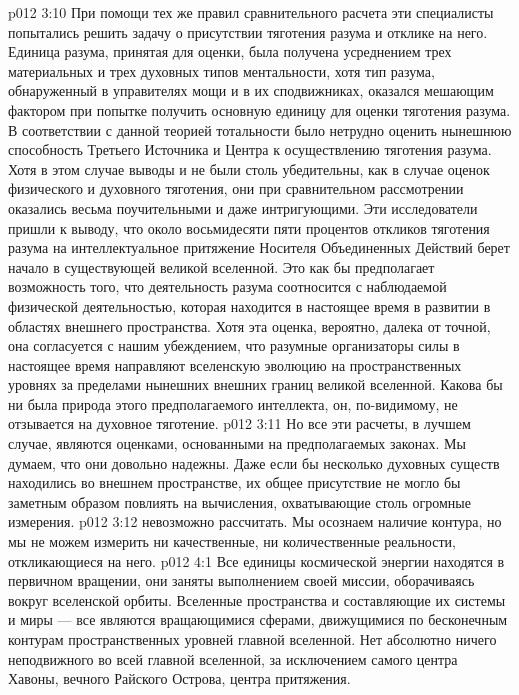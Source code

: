 \vs p012 3:10 \pc {}\bibnobreakspace {} При помощи тех же правил сравнительного расчета эти специалисты попытались решить задачу о присутствии тяготения разума и отклике на него. Единица разума, принятая для оценки, была получена усреднением трех материальных и трех духовных типов ментальности, хотя тип разума, обнаруженный в управителях мощи и в их сподвижниках, оказался мешающим фактором при попытке получить основную единицу для оценки тяготения разума. В соответствии с данной теорией тотальности было нетрудно оценить нынешнюю способность Третьего Источника и Центра к осуществлению тяготения разума. Хотя в этом случае выводы и не были столь убедительны, как в случае оценок физического и духовного тяготения, они при сравнительном рассмотрении оказались весьма поучительными и даже интригующими. Эти исследователи пришли к выводу, что около восьмидесяти пяти процентов откликов тяготения разума на интеллектуальное притяжение Носителя Объединенных Действий берет начало в существующей великой вселенной. Это как бы предполагает возможность того, что деятельность разума соотносится с наблюдаемой физической деятельностью, которая находится в настоящее время в развитии в областях внешнего пространства. Хотя эта оценка, вероятно, далека от точной, она согласуется с нашим убеждением, что разумные организаторы силы в настоящее время направляют вселенскую эволюцию на пространственных уровнях за пределами нынешних внешних границ великой вселенной. Какова бы ни была природа этого предполагаемого интеллекта, он, по\hyp{}видимому, не отзывается на духовное тяготение.
\vs p012 3:11 Но все эти расчеты, в лучшем случае, являются оценками, основанными на предполагаемых законах. Мы думаем, что они довольно надежны. Даже если бы несколько духовных существ находились во внешнем пространстве, их общее присутствие не могло бы заметным образом повлиять на вычисления, охватывающие столь огромные измерения.
\vs p012 3:12 \pc {} невозможно рассчитать. Мы осознаем наличие контура, но мы не можем измерить ни качественные, ни количественные реальности, откликающиеся на него.
\vs p012 4:1 Все единицы космической энергии находятся в первичном вращении, они заняты выполнением своей миссии, оборачиваясь вокруг вселенской орбиты. Вселенные пространства и составляющие их системы и миры --- все являются вращающимися сферами, движущимися по бесконечным контурам пространственных уровней главной вселенной. Нет абсолютно ничего неподвижного во всей главной вселенной, за исключением самого центра Хавоны, вечного Райского Острова, центра притяжения.
